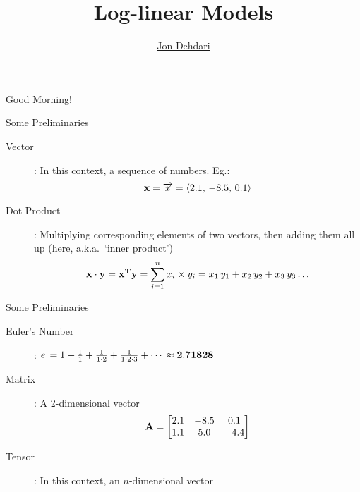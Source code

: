 \documentclass[xcolor=pdftex,x11names,table,hyperref]{beamer}
\begin{document}
\title{Log-linear Models \\[1.5em]
 }
\author{\href{http://jon.dehdari.org}{Jon Dehdari}}
\frame{\titlepage}

\begin{frame}{Good Morning!}
	\begin{center}
	\end{center}
\end{frame}

\begin{frame}{Some Preliminaries}
\begin{description}
	\item[Vector]: In this context, a sequence of numbers. Eg.:
	\begin{equation*}
	{\bf x} = \overrightarrow{x} = \langle 2.1, \, -8.5, \, 0.1 \rangle
	\end{equation*}
	\pause
	\item[Dot Product]: Multiplying corresponding elements of two vectors, then adding them all up (here, a.k.a.\ `inner product')
	\begin{equation*}
	{\bf x \cdot y} = {\bf x^Ty} =  \sum_{i=1}^n x_i \times y_i = x_1 \, y_1 + x_2 \, y_2 + x_3 \, y_3 \ldots
	\end{equation*}
\end{description}
\end{frame}

\begin{frame}{Some Preliminaries}
\begin{description}
	\item[Euler's Number]: $e \, = 1 + \frac{1}{1} + \frac{1}{1\cdot 2} + \frac{1}{1\cdot 2\cdot 3} + \cdots \, \approx {\bf 2.71828} $
	\pause
	\item[Matrix]: A 2-dimensional vector
	\begin{equation*}
	{\bf A} = 
	\begin{bmatrix}
	2.1 & -8.5 & 0.1 \\
	1.1 & 5.0 & -4.4
	 \end{bmatrix}
	\end{equation*}
	\pause
	\item[Tensor]: In this context, an $n$-dimensional vector
\end{description}
\end{frame}
\end{document}
